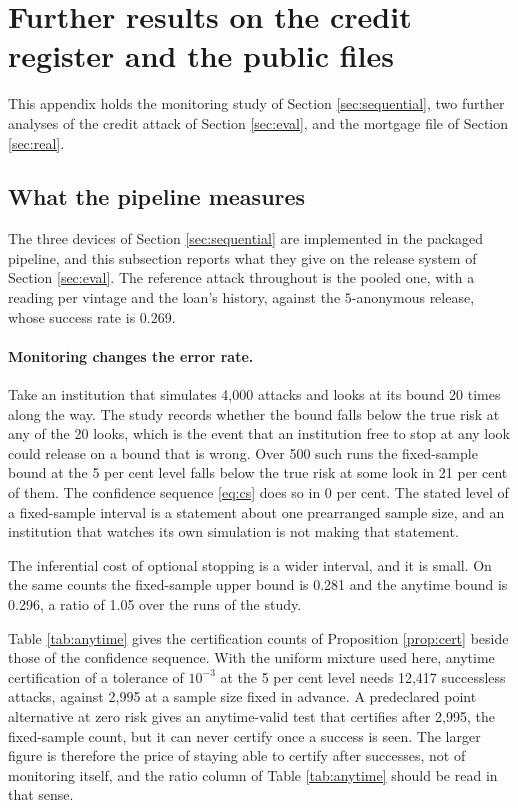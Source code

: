 \documentclass[11pt,a4paper]{article}
\theoremstyle{plain}
\theoremstyle{definition}
\theoremstyle{definition}
\theoremstyle{plain}
\begin{document}
\section{Further results on the credit register and the public files}\label{app:further-credit}

This appendix holds the monitoring study of Section \ref{sec:sequential}, two
further analyses of the credit attack of Section \ref{sec:eval}, and the mortgage
file of Section \ref{sec:real}.

\subsection{What the pipeline measures}\label{sec:sequential-evidence}

The three devices of Section \ref{sec:sequential} are implemented in the
packaged pipeline, and this subsection reports what they give on the release system of Section
\ref{sec:eval}. The reference attack throughout is the pooled one, with a
reading per vintage and the loan's history, against the $5$-anonymous release,
whose success rate is 0.269.

\paragraph{Monitoring changes the error rate.}
Take an institution that simulates 4{,}000 attacks and looks at its
bound 20 times along the way. The study records whether the bound falls below
the true risk at any of the 20 looks, which is the event that an institution
free to stop at any look could release on a bound that is wrong. Over 500 such
runs the fixed-sample bound at the 5 per cent level falls below the true risk at
some look in 21 per cent of them. The confidence sequence
\eqref{eq:cs} does so in 0 per cent. The stated level of a
fixed-sample interval is a statement about one prearranged sample size, and an
institution that watches its own simulation is not making that statement.

The inferential cost of optional stopping is a wider interval, and it is small. On the same
counts the fixed-sample upper bound is 0.281 and the anytime bound is
0.296, a ratio of 1.05 over the runs of the study.



Table \ref{tab:anytime} gives the certification counts of Proposition
\ref{prop:cert} beside those of the confidence sequence. With the uniform
mixture used here, anytime certification of a tolerance of $10^{-3}$ at the 5
per cent level needs 12{,}417 successless attacks, against 2{,}995 at a sample
size fixed in advance. A predeclared point alternative at zero risk gives an
anytime-valid test that certifies after 2{,}995, the fixed-sample count, but it
can never certify once a success is seen. The larger figure is therefore the
price of staying able to certify after successes, not of monitoring itself, and
the ratio column of Table \ref{tab:anytime} should be read in that sense.
\end{document}
